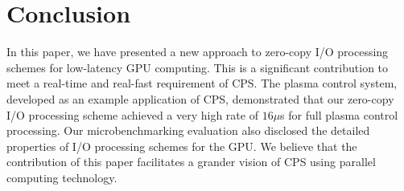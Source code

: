 \section{Conclusion}
\label{sec:conclusion}

In this paper, we have presented a new approach to zero-copy I/O
processing schemes for low-latency GPU computing.
This is a significant contribution to meet a real-time and real-fast
requirement of CPS.
The plasma control system, developed as an example application of CPS,
demonstrated that our zero-copy I/O processing scheme achieved a very
high rate of $16\mu$s for full plasma control processing.
Our microbenchmarking evaluation also disclosed the detailed properties
of I/O processing schemes for the GPU.
We believe that the contribution of this paper facilitates a grander
vision of CPS using parallel computing technology.

